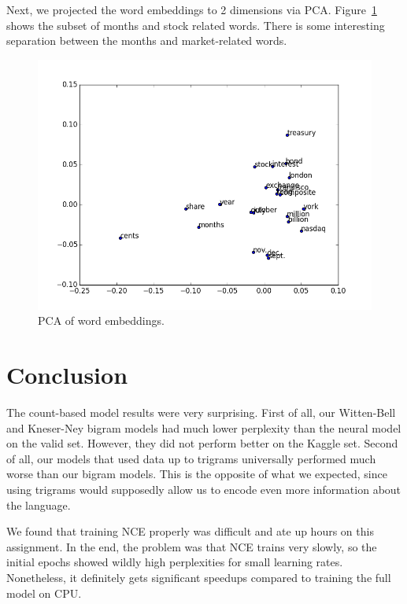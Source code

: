 \documentclass[11pt]{article}
\begin{document}
Next, we projected the word embeddings to 2 dimensions via PCA. Figure~\ref{fig:PCA} shows the subset of months and stock related words. There is some interesting separation between the months and market-related words.

\begin{figure}[H]
\centering
\includegraphics[scale=0.5]{pca}
\caption{PCA of word embeddings.}
\label{fig:PCA}
\end{figure}

\section{Conclusion}

The count-based model results were very surprising. First of all, our Witten-Bell and Kneser-Ney bigram models had much lower perplexity than the neural model on the valid set. However, they did not perform better on the Kaggle set. Second of all, our models that used data up to trigrams universally performed much worse than our bigram models. This is the opposite of what we expected, since using trigrams would supposedly allow us to encode even more information about the language. 

We found that training NCE properly was difficult and ate up hours on this assignment. In the end, the problem was that NCE trains very slowly, so the initial epochs showed wildly high perplexities for small learning rates. Nonetheless, it definitely gets significant speedups compared to training the full model on CPU. 


%
%
\end{document}
